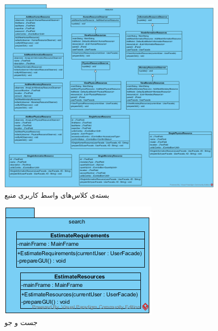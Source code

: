 \begin{figure}[H]
	\centering
	\includegraphics[width=\textwidth]{img/class-design/ui/UIResource.png}

	\caption{بسته‌ی کلاس‌های واسط کاربری منبع}
\end{figure}

\begin{figure}[H]
	\centering
	\includegraphics[width=\textwidth]{img/class-design/ui/UISearch.png}

	\caption{جست و جو}
\end{figure}

